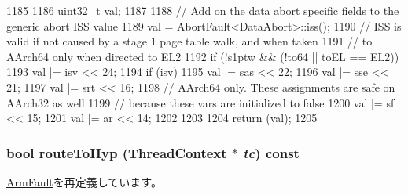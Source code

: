 \begin{DoxyCode}
1185 {
1186     uint32_t val;
1187 
1188     // Add on the data abort specific fields to the generic abort ISS value
1189     val  = AbortFault<DataAbort>::iss();
1190     // ISS is valid if not caused by a stage 1 page table walk, and when taken
1191     // to AArch64 only when directed to EL2
1192     if (!s1ptw && (!to64 || toEL == EL2)) {
1193         val |= isv << 24;
1194         if (isv) {
1195             val |= sas << 22;
1196             val |= sse << 21;
1197             val |= srt << 16;
1198             // AArch64 only. These assignments are safe on AArch32 as well
1199             // because these vars are initialized to false
1200             val |= sf << 15;
1201             val |= ar << 14;
1202         }
1203     }
1204     return (val);
1205 }
\end{DoxyCode}
\hypertarget{classArmISA_1_1DataAbort_a16facd13ba8e6d15d2b865882c379d5f}{
\subsubsection[{routeToHyp}]{\setlength{\rightskip}{0pt plus 5cm}bool routeToHyp ({\bf ThreadContext} $\ast$ {\em tc}) const}}
\label{classArmISA_1_1DataAbort_a16facd13ba8e6d15d2b865882c379d5f}


\hyperlink{classArmISA_1_1ArmFault_a6fa7b734487c2a8da04a28ace414a355}{ArmFault}を再定義しています。


